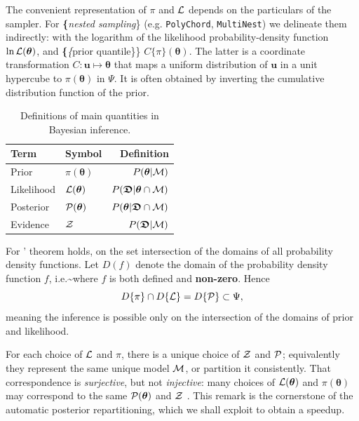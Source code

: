 \documentclass[draft,usenatbib]{mnras}
\begin{document}
The convenient representation of \(\pi\) and \({\cal L}\) depends on the
particulars of the sampler. For \textbf\{\emph{nested sampling}\}
(e.g. \texttt{PolyChord}, \texttt{MultiNest}) we delineate them
indirectly: with the logarithm of the likelihood probability-density
function \(\ln \cal L (\bm{\theta})\), and \textbf\{\emph\{prior
quantile\}\} \(C\{\pi\}(\bm{\theta})\). The latter is a coordinate
transformation \(C: \bm{u} \mapsto \bm{\theta}\) that maps a uniform
distribution of \(\bm{u}\) in a unit hypercube to \(\pi(\bm{\theta})\) in
\(\Psi\). It is often obtained by inverting the cumulative distribution
function of the prior.
\begin{table}
\caption{Definitions of main quantities in Bayesian inference.   \label{tab:defs}}
\centering
\begin{tabular}{llr}
\textbf{\textbf{Term}} & \textbf{\textbf{Symbol}} & \textbf{\textbf{Definition}}\\
\hline
Prior  & \(\pi(\bm{\theta})\) & \(P ( \bm{\theta}  \vert {\cal M})\) \\
Likelihood  & \({\cal L}(\bm{\theta})\) & \(P ( \bm{\mathfrak{D}} \vert \bm{\theta} \cap {\cal M})\) \\
Posterior  & \({\cal P}(\bm{\theta})\) & \(P ( \bm{\theta} \vert \bm{\mathfrak{D}} \cap {\cal M})\) \\
Evidence & \({\cal Z}\) & \(P ( \bm{\mathfrak{D}} \vert {\cal M})\) \\
\end{tabular}
\end{table}


For \citeauthor{1763}' theorem holds, on the set intersection of the
domains of all probability density functions. Let \(D(f)\) denote the
domain of the probability density function \(f\), i.e.\textasciitilde{}where \(f\) is
both defined and \textbf{non-zero}. Hence
\begin{equation}
D \{ \pi \} \cap D \{ {\cal L} \} = D \{ {\cal P} \} \subset \Psi,
\end{equation}
meaning the inference is possible only on the intersection of the
domains of prior and likelihood.\label{domain-discussion}

For each choice of \({\cal L}\) and \(\pi\), there is a unique choice
of \({\cal Z}\) and \({\cal P}\); equivalently they represent the same
unique model \({\cal M}\), or partition it consistently. That
correspondence is \emph{surjective}, but not \emph{injective}: many
choices of \({\cal L}(\bm{\theta})\) and \(\pi (\bm{\theta})\) may
correspond to the same \({\cal P} (\bm{\theta})\) and \({\cal Z}\)
\citep{chen-ferroz-hobson}. This remark is the cornerstone of the
automatic posterior repartitioning, which we shall exploit to
obtain a speedup.
\end{document}
